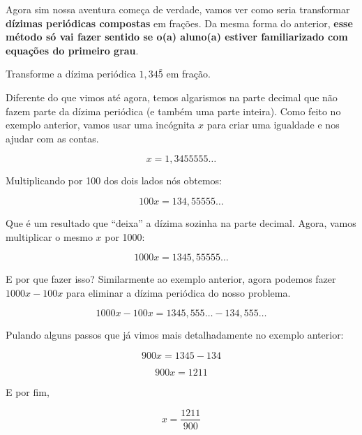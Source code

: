 Agora sim nossa aventura começa de verdade, vamos ver como seria transformar \textbf{dízimas periódicas compostas} em frações. Da mesma forma do anterior, \textbf{esse método só vai fazer sentido se o(a) aluno(a) estiver familiarizado com equações do primeiro grau}. 

\begin{exemplo}
    Transforme a dízima periódica \(1,34\bar{5}\) em fração.

    \vspace{0.5cm}

    Diferente do que vimos até agora, temos algarismos na parte decimal que não fazem parte da dízima periódica (e também uma parte inteira). Como feito no exemplo anterior, vamos usar uma incógnita \(x\) para criar uma igualdade e nos ajudar com as contas.

    \begin{equation}
        x=1,3455555\dots
    \end{equation}

    Multiplicando por 100 dos dois lados nós obtemos:

    \begin{equation}
        100x=134,55555\dots
    \end{equation}

    Que é um resultado que ``deixa'' a dízima sozinha na parte decimal. Agora, vamos multiplicar o mesmo \(x\) por 1000:

    \begin{equation}
        1000x=1345,55555\dots
    \end{equation}

    E por que fazer isso? Similarmente ao exemplo anterior, agora podemos fazer \(1000x-100x\) para eliminar a dízima periódica do nosso problema. 

    \begin{equation}
        1000x-100x=1345,555\dots-134,555\dots
    \end{equation}

    Pulando alguns passos que já vimos mais detalhadamente no exemplo anterior:

    \begin{equation}
        900x=1345-134
    \end{equation}

    \begin{equation}
        900x=1211
    \end{equation}

    E por fim,

    \begin{equation}
        x=\frac{1211}{900}
    \end{equation}
\end{exemplo}

